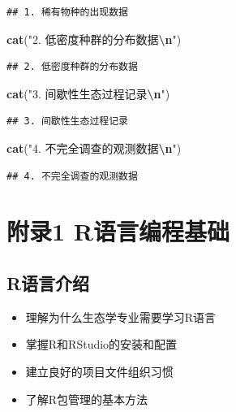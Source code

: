 \documentclass[
]{book}
\newenvironment{Shaded}{\begin{snugshade}}{\end{snugshade}}
\newcommand{\FunctionTok}[1]{\textcolor[rgb]{0.13,0.29,0.53}{\textbf{#1}}}
\newcommand{\NormalTok}[1]{#1}
\newcommand{\SpecialCharTok}[1]{\textcolor[rgb]{0.81,0.36,0.00}{\textbf{#1}}}
\newcommand{\StringTok}[1]{\textcolor[rgb]{0.31,0.60,0.02}{#1}}
\providecommand{\tightlist}{%
  \setlength{\itemsep}{0pt}\setlength{\parskip}{0pt}}
\begin{document}
\begin{verbatim}
## 1. 稀有物种的出现数据
\end{verbatim}

\begin{Shaded}
\begin{Highlighting}[]
\FunctionTok{cat}\NormalTok{(}\StringTok{"2. 低密度种群的分布数据}\SpecialCharTok{\textbackslash{}n}\StringTok{"}\NormalTok{)}
\end{Highlighting}
\end{Shaded}

\begin{verbatim}
## 2. 低密度种群的分布数据
\end{verbatim}

\begin{Shaded}
\begin{Highlighting}[]
\FunctionTok{cat}\NormalTok{(}\StringTok{"3. 间歇性生态过程记录}\SpecialCharTok{\textbackslash{}n}\StringTok{"}\NormalTok{)}
\end{Highlighting}
\end{Shaded}

\begin{verbatim}
## 3. 间歇性生态过程记录
\end{verbatim}

\begin{Shaded}
\begin{Highlighting}[]
\FunctionTok{cat}\NormalTok{(}\StringTok{"4. 不完全调查的观测数据}\SpecialCharTok{\textbackslash{}n}\StringTok{"}\NormalTok{)}
\end{Highlighting}
\end{Shaded}

\begin{verbatim}
## 4. 不完全调查的观测数据
\end{verbatim}

\hypertarget{ux9644ux5f551-rux8bedux8a00ux7f16ux7a0bux57faux7840}{%
\chapter{附录1 R语言编程基础}\label{ux9644ux5f551-rux8bedux8a00ux7f16ux7a0bux57faux7840}}

\hypertarget{rux8bedux8a00ux4ecbux7ecd}{%
\section{R语言介绍}\label{rux8bedux8a00ux4ecbux7ecd}}

\begin{itemize}
\tightlist
\item
  理解为什么生态学专业需要学习R语言
\item
  掌握R和RStudio的安装和配置
\item
  建立良好的项目文件组织习惯
\item
  了解R包管理的基本方法
\end{itemize}
\end{document}
